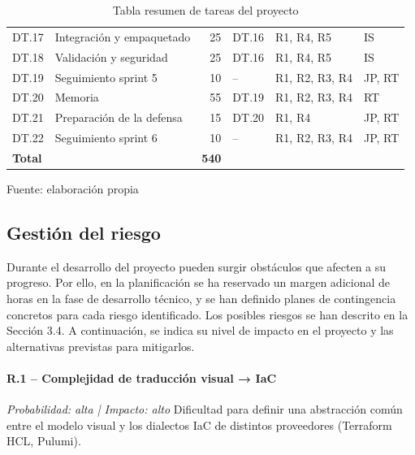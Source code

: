 \documentclass{article}
\begin{document}
{\begin{table}[H]
\begin{tabular}{|l|l|r|l|l|l|}
    DT.17 & Integración y empaquetado           & 25 & DT.16      & R1, R4, R5        & IS \\
    DT.18 & Validación y seguridad              & 25 & DT.16      & R1, R4, R5        & IS \\
    DT.19 & Seguimiento sprint 5                & 10 & --         & R1, R2, R3, R4    & JP, RT \\
    \hline
    DT.20 & Memoria                             & 55 & DT.19 & R1, R2, R3, R4    & RT \\
    DT.21 & Preparación de la defensa           & 15 & DT.20      & R1, R4            & JP, RT \\
    DT.22 & Seguimiento sprint 6                & 10 & --         & R1, R2, R3, R4    & JP, RT \\
    \hline
    \multicolumn{2}{|l|}{\textbf{Total}} & \textbf{540} & & & \\
    \hline
    \end{tabular}
    \caption{Tabla resumen de tareas del proyecto}
    \footnotesize Fuente: elaboración propia
    \label{tab:tareas}
    \end{table}

    \par



       \subsection{Gestión del riesgo}
       \label{sec:riesgos}
        \setlength{\parskip}{1em}
        \justify
        Durante el desarrollo del proyecto pueden surgir obstáculos que afecten a su progreso. 
        Por ello, en la planificación se ha reservado un margen adicional de horas en la fase 
        de desarrollo técnico, y se han definido planes de contingencia concretos para cada 
        riesgo identificado. Los posibles riesgos se han descrito en la Sección 3.4. A 
        continuación, se indica su nivel de impacto en el proyecto y las alternativas previstas 
        para mitigarlos.

        \paragraph{R.1 – Complejidad de traducción visual → IaC}
        \textit{Probabilidad: alta | Impacto: alto}
        \justify
        Dificultad para definir una abstracción común entre el modelo visual y los dialectos 
        IaC de distintos proveedores (Terraform HCL, Pulumi).

}
\end{document}
